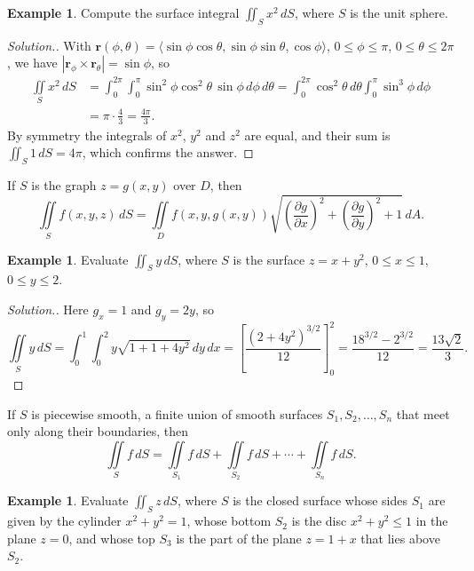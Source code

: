 \documentclass[11pt,a4paper]{article}
\theoremstyle{definition}
\newtheorem{exa}[thm]{Example}
\newenvironment{solution}
  {\renewcommand{\qedsymbol}{}\begin{proof}[\textit{Solution}.]}
  {\end{proof}}
\begin{document}
\begin{exa}
\label{ex:surfx2}
Compute the surface integral $\iint_S x^2 \,dS$, where $S$ is the unit sphere.
\end{exa}

\begin{solution}
With $\mathbf r(\phi,\theta) = \langle\sin\phi \cos \theta, \sin\phi \sin \theta,
\cos \phi\rangle$, $0\leq \phi \leq \pi$, $0 \leq \theta \leq 2\pi$, we have
$|\mathbf r_\phi\times\mathbf r_\theta| = \sin\phi$, so
\begin{align*}
\iint\limits_S x^2\,dS & = \int^{2\pi}_0\int^{\pi}_0 \sin^2\phi \cos^2\theta\,
\sin \phi\,d\phi\, d\theta = \int^{2\pi}_0\cos^2\theta \,d\theta
\int^{\pi}_0\sin^3\phi \,d\phi\\
& = \pi\cdot\frac43 = \frac{4\pi}{3} .
\end{align*}
By symmetry the integrals of $x^2$, $y^2$ and $z^2$ are equal, and their sum is
$\iint_S 1\,dS = 4\pi$, which confirms the answer.
\end{solution}

If $S$ is the graph $z = g(x,y)$ over $D$, then
\[\iint\limits_S f(x,y,z)\,dS = \iint\limits_D f(x,y,g(x,y))\sqrt{
\left(\frac{\partial g}{\partial x}\right)^2 + \left(\frac{\partial g}{\partial
y}\right)^2 + 1}\, dA .\]

\begin{exa}
\label{ex:surfy}
Evaluate $\iint_S y\,dS$, where $S$ is the surface $z = x + y^2$,
$0\leq x\leq 1$, $0 \leq y \leq 2$.
\end{exa}

\begin{solution}
Here $g_x = 1$ and $g_y = 2y$, so
\[\iint\limits_Sy\, dS = \int_0^1\int_0^2 y\sqrt{1 + 1 + 4y^2}\,dy\,dx =
\left[\frac{(2 + 4y^2)^{3/2}}{12}\right]_0^2 = \frac{18^{3/2} - 2^{3/2}}{12} =
\frac{13\sqrt{2}}{3} .\]
\end{solution}

If $S$ is piecewise smooth, a finite union of smooth surfaces
$S_1, S_2,\dots , S_n$ that meet only along their boundaries, then
\[\iint\limits_{S} f \,dS = \iint\limits_{S_1}f\,dS + \iint\limits_{S_2}f\,dS +
\cdots +\iint\limits_{S_n}f\,dS .\]

\begin{exa}
\label{ex:surfpiecewise}
Evaluate $\iint_S z\,dS$, where $S$ is the closed surface whose sides $S_1$ are
given by the cylinder $x^2 + y^2 =1$, whose bottom $S_2$ is the disc
$x^2 + y^2 \leq 1$ in the plane $z =0$, and whose top $S_3$ is the part of the
plane $z = 1 + x$ that lies above $S_2$.
\end{exa}
\end{document}
